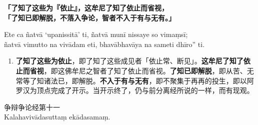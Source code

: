 \textbf{「了知了这些为『依止』，这牟尼了知了依止而省视，\\}
\textbf{「了知已即解脱，不落入争论，智者不入于有与无有。」}

Ete ca ñatvā ‘upanissitā’ ti, ñatvā munī nissaye so vimaṃsī;\\
ñatvā vimutto na vivādam eti, bhavābhavāya na sameti dhīro” ti. %

\begin{enumerate}\item \textbf{了知了这些为依止}，即了知了这些成见者「依止常、断见」。\textbf{这牟尼了知了依止而省视}，即这佛牟尼之智者了知了依止而省视。\textbf{了知已即解脱}，即从苦、无常等了知诸法已，即解脱。\textbf{不入于有与无有}，即不聚集于再再的投生，即以阿罗汉为顶点完成了开示。当开示终了，仍与前分离经所说的一样，而有现观。\end{enumerate}

\begin{center}\vspace{1em}争辩争论经第十一\\Kalahavivādasuttaṃ ekādasamaṃ.\end{center}